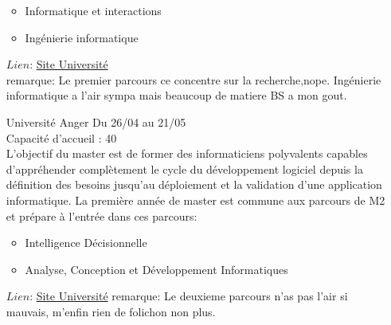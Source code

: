 \documentclass[a4paper,11pt]{article}
\begin{document}
\begin{enumerate}
\begin{itemize}
                    \item Informatique et interactions
                    \item Ingénierie informatique
                \end{itemize}
                $Lien$: \href{https://univ-cotedazur.fr/offre-de-formation/master-informatique-1}{Site Université}
                \\remarque: Le premier parcours ce concentre sur la recherche,nope. Ingénierie informatique a l'air sympa mais beaucoup de matiere BS a mon gout.
\\
        \item [\color{LightOrangeHaf}Université Anger] Du 26/04 au 21/05
                \\Capacité d'accueil : 40
                \\L’objectif du master est de former des informaticiens polyvalents capables d’appréhender complètement le cycle du développement logiciel depuis la définition des besoins jusqu’au déploiement et la validation d’une application informatique. La première année de master est commune aux parcours de M2 et prépare à l'entrée dans ces parcours:
                \begin{itemize}
                    \item Intelligence Décisionnelle
                    \item Analyse, Conception et Développement Informatiques
                \end{itemize}
                $Lien$: \href{http://www.info.univ-angers.fr/dptinfo/}{Site Université}
                remarque: Le deuxieme parcours n'as pas l'air si mauvais, m'enfin rien de folichon non plus.
                \\



    \end{enumerate}
\end{document}
